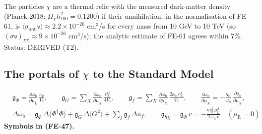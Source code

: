 \documentclass[
  10pt,
]{article}
\begin{document}
The particles \(\chi\) are a thermal relic with the measured dark-matter
density (Planck 2018: \(\Omega_\chi h_{100}^2 = 0.1200\)) if their
annihilation, in the normalisation of FE-61, is
\(\langle\sigma_{\mathrm{ann}}\mathsf{v}\rangle \approx 2.2\times10^{-26}\)
cm\(^3\)/s for every mass from 10 GeV to 10 TeV (so
\((\sigma\mathsf{v})_{\chi\bar\chi} \approx 9\times10^{-26}\)
cm\(^3\)/s); the analytic estimate of FE-61 agrees within 7\%. Status:
DERIVED (T2).

\hypertarget{the-portals-of-chi-to-the-standard-model}{%
\subsection{\texorpdfstring{The portals of \(\chi\) to the Standard
Model}{The portals of \textbackslash chi to the Standard Model}}\label{the-portals-of-chi-to-the-standard-model}}

\[
\begin{aligned}
&\mathfrak{g}_{\Phi} = \frac{\partial\omega_{\mathrm{b}}}{\partial\mu_{\mathrm{L}}}\,\frac{c_\Phi}{V_*},\qquad
 \mathfrak{g}_{G} = \sum_X\frac{\partial\omega_{\mathrm{b}}}{\partial\mu_X}\,\frac{c^{G}_X}{4V_*},\qquad
 \mathfrak{g}_{f} = \sum_X\frac{\partial\omega_{\mathrm{b}}}{\partial\mu_X}\,\frac{2\omega_{\mathrm{b}}\,c^{f}_X}{V_*},\qquad
 \frac{\partial\omega_{\mathrm{b}}}{\partial\mu_X} = -\frac{q_{\mathrm{b}}}{\omega_{\mathrm{b}}}\,\frac{\partial q_{\mathrm{b}}}{\partial\mu_X},\\
&\Delta\omega_{\mathrm{b}} = \mathfrak{g}_{\Phi}\,\Delta\langle\Phi^\dagger\Phi\rangle + \mathfrak{g}_{G}\,\Delta\langle G^2\rangle + \sum_f\mathfrak{g}_{f}\,\Delta n_f,\qquad
 \mathfrak{g}_{h\chi} = \mathfrak{g}_{\Phi}\,v = -\frac{m_\Psi^2\,\mu_{\mathrm{L}}^2}{2\,\omega_{\mathrm{b}}\,v}\quad(\mu_{\mathrm{R}} = 0)
\end{aligned} \tag{FE-47}
\] \textbf{Symbols in (FE-47).}
\end{document}

